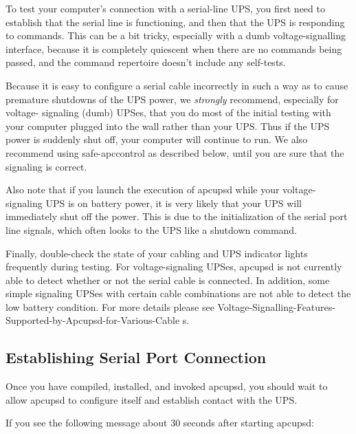 {{{{{{{To test your computer's connection with a serial-line UPS, you first need to
establish that the serial line is functioning, and then that the UPS is
responding to commands.  This can be a bit tricky, especially with a dumb
voltage-signalling interface, because it is completely quiescent when there
are no commands being passed, and the command repertoire doesn't include any
self-tests.  

Because it is easy to configure a serial cable incorrectly in such a way as to
cause premature shutdowns of the UPS power, we {\it strongly} recommend,
especially for voltage- signaling (dumb) UPSes, that you do most of the
initial testing with your computer plugged into the wall rather than your UPS.
Thus if the UPS power is suddenly shut off, your computer will continue to
run. We also recommend using safe-apccontrol as described below, until you are
sure that the signaling is correct.  

Also note that if you launch the execution of apcupsd while your
voltage-signaling UPS is on battery power, it is very likely that your UPS
will immediately shut off the power. This is due to the initialization of the
serial port line signals, which often looks to the UPS like a shutdown
command.  

Finally, double-check the state of your cabling and UPS indicator lights
frequently during testing.  For voltage-signaling UPSes, apcupsd is not
currently able to detect whether or not the serial cable is connected. In
addition, some simple signaling UPSes with certain cable combinations are not
able to detect the low battery condition.  For more details please see 
{Voltage-Signalling-Features-Supported-by-Apcupsd-for-Various-Cable%
s}. 

\label{Establishing-Serial-Port-Connection}

\subsection*{Establishing Serial Port Connection}

\label{index-Testing_002c-Serial-221}
Once you have compiled, installed, and invoked apcupsd, you should wait to
allow apcupsd to configure itself and establish contact with the UPS.  

If you see the following message about 30 seconds after starting apcupsd: 

}}}}}}}
